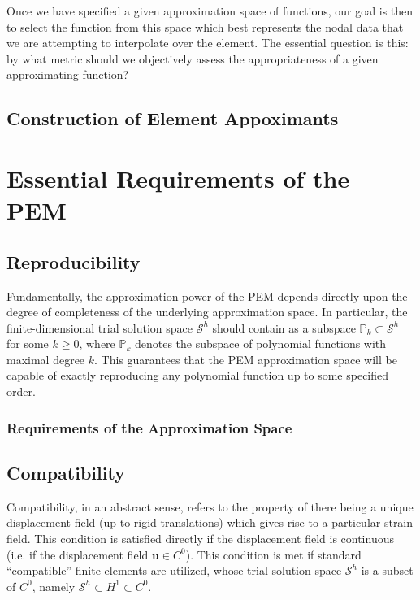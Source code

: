 Once we have specified a given approximation space of functions, our goal is then to select the function from this space which best represents the nodal data that we are attempting to interpolate over the element. The essential question is this: by what metric should we objectively assess the appropriateness of a given approximating function?

\subsection{Construction of Element Appoximants}

\section{Essential Requirements of the PEM}

\subsection{Reproducibility}

Fundamentally, the approximation power of the PEM depends directly upon the degree of completeness of the underlying approximation space. In particular, the finite-dimensional trial solution space $\mathcal{S}^h$ should contain as a subspace $\mathbb{P}_k \subset \mathcal{S}^h$ for some $k \geq 0$, where $\mathbb{P}_k$ denotes the subspace of polynomial functions with maximal degree $k$. This guarantees that the PEM approximation space will be capable of exactly reproducing any polynomial function up to some specified order.


\subsubsection{Requirements of the Approximation Space}
\subsection{Compatibility}


Compatibility, in an abstract sense, refers to the property of there being a unique displacement field (up to rigid translations) which gives rise to a particular strain field. This condition is satisfied directly if the displacement field is continuous (i.e. if the displacement field $\mathbf{u} \in C^0$). This condition is met if standard ``compatible'' finite elements are utilized, whose trial solution space $\mathcal{S}^h$ is a subset of $C^0$, namely $\mathcal{S}^h \subset H^1 \subset C^0$.


